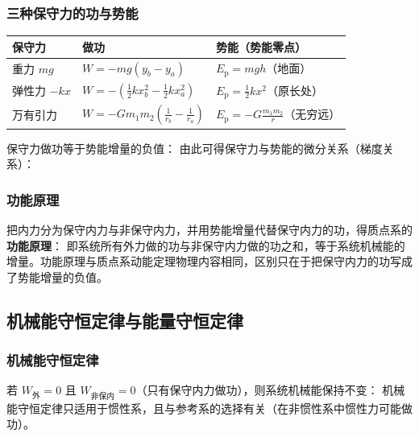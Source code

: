         \subsubsection{三种保守力的功与势能}
        \begin{center}
        \small
        \setlength{\tabcolsep}{9pt}
        \begin{tabular}{lll}
        \toprule
        保守力 & 做功 & 势能（势能零点） \\
        \midrule
        重力 $mg$ & $W=-mg\left(y_{b}-y_{a}\right)$ & $E_{\mathrm{p}}=mgh$（地面） \\
        弹性力 $-kx$ & $W=-\left(\frac{1}{2}kx_{b}^{2}-\frac{1}{2}kx_{a}^{2}\right)$
        & $E_{\mathrm{p}}=\frac{1}{2}kx^{2}$（原长处） \\
        万有引力 & $W=-Gm_{1}m_{2}\left(\frac{1}{r_{b}}-\frac{1}{r_{a}}\right)$
        & $E_{\mathrm{p}}=-G\frac{m_{1}m_{2}}{r}$（无穷远） \\
        \bottomrule
        \end{tabular}
        \end{center}
        保守力做功等于势能增量的负值：
        由此可得保守力与势能的微分关系（梯度关系）：

        \subsubsection{功能原理}
        把内力分为保守内力与非保守内力，并用势能增量代替保守内力的功，得质点系的\textbf{功能原理}：
        即系统所有外力做的功与非保守内力做的功之和，等于系统机械能的增量。功能原理与质点系动能定理物理内容相同，区别只在于把保守内力的功写成了势能增量的负值。

    \subsection{机械能守恒定律与能量守恒定律}
        \subsubsection{机械能守恒定律}
        若 $W_{\text{外}}=0$ 且 $W_{\text{非保内}}=0$（只有保守内力做功），则系统机械能保持不变：
        机械能守恒定律只适用于惯性系，且与参考系的选择有关（在非惯性系中惯性力可能做功）。

